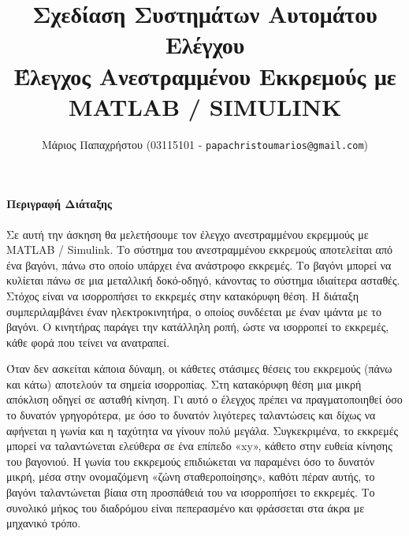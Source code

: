 \documentclass[a4paper,oneside, 12pt]{article}
\title{\textbf{Σχεδίαση Συστημάτων Αυτομάτου Ελέγχου} \\ Έλεγχος Ανεστραμμένου Εκκρεμούς με MATLAB / SIMULINK}
\author{Μάριος Παπαχρήστου (03115101 - \texttt{papachristoumarios@gmail.com})
}
\date{\hrule}
\begin{document}
\maketitle

\paragraph{Περιγραφή Διάταξης} Σε αυτή την άσκηση θα μελετήσουμε τον έλεγχο ανεστραμμένου εκρεμμούς με MATLAB / Simulink. Το σύστημα του ανεστραμμένου εκκρεμούς αποτελείται από ένα βαγόνι, πάνω στο οποίο υπάρχει ένα ανάστροφο εκκρεμές. Το βαγόνι μπορεί να κυλίεται πάνω σε μια μεταλλική δοκό-οδηγό, κάνοντας το σύστημα ιδιαίτερα ασταθές. Στόχος είναι να ισορροπήσει το εκκρεμές στην κατακόρυφη θέση. Η διάταξη συμπεριλαμβάνει έναν ηλεκτροκινητήρα, ο οποίος συνδέεται με έναν ιμάντα με το βαγόνι. Ο κινητήρας παράγει την κατάλληλη ροπή, ώστε να ισορροπεί το εκκρεμές, κάθε φορά που τείνει να ανατραπεί.

Όταν δεν ασκείται κάποια δύναμη, οι κάθετες στάσιμες θέσεις του εκκρεμούς (πάνω και κάτω) αποτελούν τα σημεία ισορροπίας. Στη κατακόρυφη θέση μια μικρή απόκλιση οδηγεί σε ασταθή κίνηση. Γι αυτό ο έλεγχος πρέπει να πραγματοποιηθεί όσο το δυνατόν γρηγορότερα, με όσο το δυνατόν λιγότερες ταλαντώσεις και δίχως να αφήνεται η γωνία και η ταχύτητα να γίνουν πολύ μεγάλα. Συγκεκριμένα, το εκκρεμές μπορεί να ταλαντώνεται ελεύθερα σε ένα επίπεδο «xy», κάθετο στην ευθεία κίνησης του βαγονιού. Η γωνία του εκκρεμούς επιδιώκεται να παραμένει όσο το δυνατόν μικρή, μέσα στην ονομαζόμενη «ζώνη σταθεροποίησης», καθότι πέραν αυτής, το βαγόνι ταλαντώνεται βίαια στη προσπάθειά του να ισορροπήσει το εκκρεμές. Το συνολικό μήκος του διαδρόμου είναι πεπερασμένο και φράσσεται στα άκρα με μηχανικό τρόπο.
\end{document}
